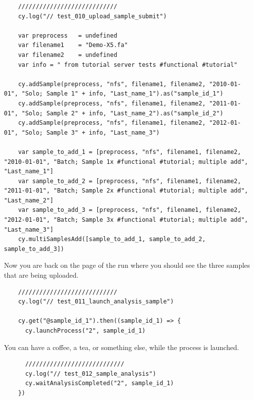 \begin{verbatim}
    ////////////////////////////
    cy.log("// test_010_upload_sample_submit")

    var preprocess   = undefined
    var filename1    = "Demo-X5.fa"
    var filename2    = undefined
    var info = " from tutorial server tests #functional #tutorial"

    cy.addSample(preprocess, "nfs", filename1, filename2, "2010-01-01", "Solo; Sample 1" + info, "Last_name_1").as("sample_id_1")
    cy.addSample(preprocess, "nfs", filename1, filename2, "2011-01-01", "Solo; Sample 2" + info, "Last_name_2").as("sample_id_2")
    cy.addSample(preprocess, "nfs", filename1, filename2, "2012-01-01", "Solo; Sample 3" + info, "Last_name_3")

    var sample_to_add_1 = [preprocess, "nfs", filename1, filename2, "2010-01-01", "Batch; Sample 1x #functional #tutorial; multiple add", "Last_name_1"]
    var sample_to_add_2 = [preprocess, "nfs", filename1, filename2, "2011-01-01", "Batch; Sample 2x #functional #tutorial; multiple add", "Last_name_2"]
    var sample_to_add_3 = [preprocess, "nfs", filename1, filename2, "2012-01-01", "Batch; Sample 3x #functional #tutorial; multiple add", "Last_name_3"]
    cy.multiSamplesAdd([sample_to_add_1, sample_to_add_2, sample_to_add_3])

\end{verbatim}

Now you are back on the page of the run where you should see the three samples
that are being uploaded.

\begin{verbatim}
    ////////////////////////////
    cy.log("// test_011_launch_analysis_sample")

    cy.get("@sample_id_1").then((sample_id_1) => {
      cy.launchProcess("2", sample_id_1)

\end{verbatim}

You can have a coffee, a tea, or something else, while the process is
launched.

\begin{verbatim}
      ////////////////////////////
      cy.log("// test_012_sample_analysis")
      cy.waitAnalysisCompleted("2", sample_id_1)
    })

\end{verbatim}

